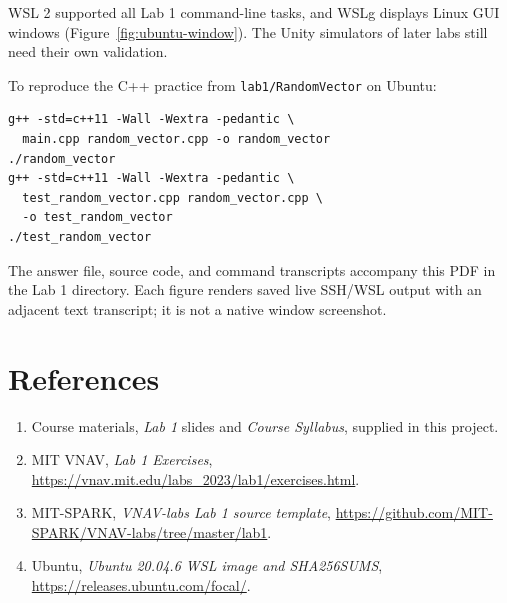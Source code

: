 \documentclass[a4paper,nobib]{tufte-handout}
\begin{document}
WSL 2 supported all Lab 1 command-line tasks, and WSLg displays Linux GUI
windows (Figure~\ref{fig:ubuntu-window}). The Unity simulators of later labs
still need their own validation.

To reproduce the C++ practice from \texttt{lab1/RandomVector} on Ubuntu:
\begin{lstlisting}
g++ -std=c++11 -Wall -Wextra -pedantic \
  main.cpp random_vector.cpp -o random_vector
./random_vector
g++ -std=c++11 -Wall -Wextra -pedantic \
  test_random_vector.cpp random_vector.cpp \
  -o test_random_vector
./test_random_vector
\end{lstlisting}
The answer file, source code, and command transcripts accompany this PDF in
the Lab 1 directory. Each figure renders saved live SSH/WSL output with an
adjacent text transcript; it is not a native window screenshot.

\section{References}
\begin{fullwidth}
\footnotesize
\begin{enumerate}
\item Course materials, \emph{Lab 1} slides and \emph{Course Syllabus}, supplied in this project.
\item MIT VNAV, \emph{Lab 1 Exercises}, \url{https://vnav.mit.edu/labs_2023/lab1/exercises.html}.
\item MIT-SPARK, \emph{VNAV-labs Lab 1 source template}, \url{https://github.com/MIT-SPARK/VNAV-labs/tree/master/lab1}.
\item Ubuntu, \emph{Ubuntu 20.04.6 WSL image and SHA256SUMS}, \url{https://releases.ubuntu.com/focal/}.
\end{enumerate}
\end{fullwidth}
\end{document}

